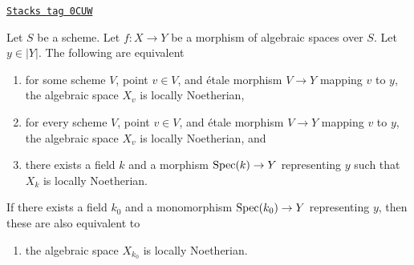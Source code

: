 \begin{lemma}
\label{spaces-divisors-lemma-locally-noetherian-fibre}
\href{https://stacks.math.columbia.edu/tag/0CUW}{\texttt{Stacks tag 0CUW}}

Let $S$ be a scheme. Let $f : X \to Y$ be a morphism of algebraic spaces
over $S$. Let $y \in |Y|$. The following are equivalent
\begin{enumerate}
\item for some scheme $V$, point $v \in V$, and \'etale morphism $V \to Y$
mapping $v$ to $y$, the algebraic space $X_v$ is locally Noetherian,
\item for every scheme $V$, point $v \in V$, and \'etale morphism $V \to Y$
mapping $v$ to $y$, the algebraic space $X_v$ is locally Noetherian, and
\item there exists a field $k$ and a morphism $\operatorname{Spec}(k) \to Y$ representing
$y$ such that $X_k$ is locally Noetherian.
\end{enumerate}
If there exists a field $k_0$ and a monomorphism $\operatorname{Spec}(k_0) \to Y$
representing $y$, then these are also equivalent to
\begin{enumerate}
\item[(4)] the algebraic space $X_{k_0}$ is locally Noetherian.
\end{enumerate}
\end{lemma}

